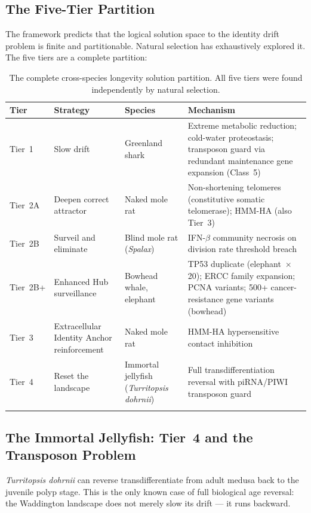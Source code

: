 \documentclass[12pt,a4paper]{article}
\begin{document}
\subsection{The Five-Tier Partition}

The framework predicts that the logical solution space to the identity drift
problem is finite and partitionable. Natural selection has exhaustively
explored it. The five tiers are a complete partition:

\begin{longtable}{p{2.5cm} p{3.5cm} p{3cm} p{4cm}}
  \toprule
  \textbf{Tier} & \textbf{Strategy} & \textbf{Species} &
  \textbf{Mechanism} \\
  \midrule
  Tier~1 & Slow drift & Greenland shark & Extreme metabolic
    reduction; cold-water proteostasis; transposon guard via
    redundant maintenance gene expansion (Class~5) \\
  \addlinespace
  Tier~2A & Deepen correct attractor & Naked mole rat &
    Non-shortening telomeres (constitutive somatic telomerase);
    HMM-HA (also Tier~3) \\
  \addlinespace
  Tier~2B & Surveil and eliminate & Blind mole rat
    (\textit{Spalax}) & IFN-$\beta$ community necrosis on
    division rate threshold breach \\
  \addlinespace
  Tier~2B+ & Enhanced Hub surveillance & Bowhead whale,
    elephant & TP53 duplicate (elephant~$\times$20); ERCC
    family expansion; PCNA variants; 500+ cancer-resistance
    gene variants (bowhead) \\
  \addlinespace
  Tier~3 & Extracellular Identity Anchor reinforcement &
    Naked mole rat & HMM-HA hypersensitive contact
    inhibition \\
  \addlinespace
  Tier~4 & Reset the landscape & Immortal jellyfish
    (\textit{Turritopsis dohrnii}) & Full transdifferentiation
    reversal with piRNA/PIWI transposon guard \\
  \bottomrule
  \caption{The complete cross-species longevity solution partition.
    All five tiers were found independently by natural selection.}
\end{longtable}

\subsection{The Immortal Jellyfish: Tier~4 and the Transposon Problem}

\textit{Turritopsis dohrnii} can reverse transdifferentiate from adult
medusa back to the juvenile polyp stage. This is the only known case of
full biological age reversal: the Waddington landscape does not merely slow
its drift --- it runs backward.
\end{document}
